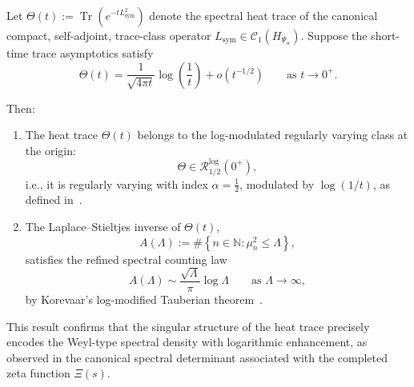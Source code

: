 \begin{lemma}
\label{lem:laplace_kernel_growth_class}
Let \( \Theta(t) := \operatorname{Tr}(e^{-t L_{\mathrm{sym}}^2}) \) denote the spectral heat trace of the canonical compact, self-adjoint, trace-class operator \( L_{\mathrm{sym}} \in \mathcal{C}_1(H_{\Psi_\alpha}) \). Suppose the short-time trace asymptotics satisfy
\[
\Theta(t) = \frac{1}{\sqrt{4\pi t}} \log\left( \frac{1}{t} \right) + o(t^{-1/2}) \qquad \text{as } t \to 0^+.
\]

Then:
\begin{enumerate}
  \item The heat trace \( \Theta(t) \) belongs to the log-modulated regularly varying class at the origin:
  \[
  \Theta \in \mathcal{R}_{1/2}^{\log}(0^+),
  \]
  i.e., it is regularly varying with index \( \alpha = \tfrac{1}{2} \), modulated by \( \log(1/t) \), as defined in~\cite[Ch.~III, §5]{Korevaar2004Tauberian}.

  \item The Laplace–Stieltjes inverse of \( \Theta(t) \),
  \[
  A(\Lambda) := \#\left\{ n \in \mathbb{N} : \mu_n^2 \le \Lambda \right\},
  \]
  satisfies the refined spectral counting law
  \[
  A(\Lambda) \sim \frac{\sqrt{\Lambda}}{\pi} \log \Lambda \qquad \text{as } \Lambda \to \infty,
  \]
  by Korevaar’s log-modified Tauberian theorem~\cite[Thm.~5.5]{Korevaar2004Tauberian}.
\end{enumerate}

\noindent
This result confirms that the singular structure of the heat trace precisely encodes the Weyl-type spectral density with logarithmic enhancement, as observed in the canonical spectral determinant associated with the completed zeta function \( \Xi(s) \).
\end{lemma}
